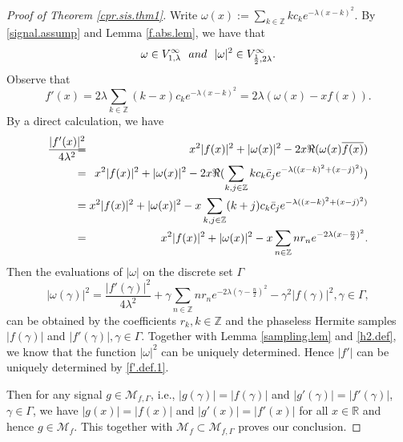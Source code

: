 \documentclass[11pt,oneside,reqno]{amsart}
\numberwithin{equation}{section}
\def\R{ {\mathbb R} }
\def\Z{ {\mathbb Z} }
\begin{document}
\begin{proof}[Proof of Theorem \ref{cpr.sis.thm1}]
 Write $\omega(x):=\sum_{k\in\Z}kc_ke^{-\lambda(x-k)^2}$.  By \eqref{signal.assump} and  Lemma \ref{f.abs.lem}, we have that
 \begin{equation}\label{h2.def}
\omega \in V^{\infty}_{1,\lambda} \ \ {\rm and} \ \
|\omega|^2\in V^{\infty}_{\frac{1}{2}, 2\lambda}.
\end{equation}
Observe that
\begin{equation*}\label{f'.def}
f'(x)=2\lambda\sum_{k\in\Z}(k-x)c_ke^{-\lambda(x-k)^2}=2\lambda(\omega(x)-xf(x)).%
\end{equation*}
By a direct calculation, we have %
\begin{eqnarray}\label{f'.def.1}
\frac{|f'(x)|^2}{4\lambda^2}\hskip-0.05in&\hskip-0.1in=&\hskip-0.1in x^2|f(x)|^2+|\omega(x)|^2 -2x\Re( \omega(x)\overline{f(x)})\nonumber\\
\hskip-0.05in&\hskip-0.1in=&\hskip-0.1in x^2|f(x)|^2+|\omega(x)|^2 -2x\Re( \sum_{k,j\in\Z}kc_k\bar{c}_je^{-\lambda((x-k)^2+(x-j)^2)})\nonumber\\
\hskip-0.05in&\hskip-0.1in=&\hskip-0.1in x^2|f(x)|^2+|\omega(x)|^2 -x\sum_{k,j\in\Z}(k+j)c_k\bar{c}_je^{-\lambda((x-k)^2+(x-j)^2)}\nonumber\\
\hskip-0.05in&\hskip-0.1in=&\hskip-0.1in x^2|f(x)|^2+|\omega(x)|^2 -x\sum_{n\in\Z}nr_ne^{-2\lambda(x-\frac{n}{2})^2}.
\end{eqnarray}
Then the evaluations of $|\omega|$ on the discrete set $\Gamma$ %
\begin{equation*}\label{h.sample}
|\omega(\gamma)|^2=\frac{|f'(\gamma)|^2}{4\lambda^2}+\gamma\sum_{n\in\Z}nr_ne^{-2\lambda(\gamma-\frac{n}{2})^2}-\gamma^2|f(\gamma)|^2, \gamma\in \Gamma,
\end{equation*}
can be obtained by the coefficients $r_k, k\in \Z$ and the phaseless Hermite samples $|f(\gamma)|$ and $|f'(\gamma)|, \gamma\in\Gamma$.
Together with Lemma \ref{sampling.lem} and \eqref{h2.def}, we know that the  function $|\omega|^2$ can be uniquely determined. %
Hence $|f'|$ can be uniquely determined by \eqref{f'.def.1}.%




Then for any signal $g\in {\mathcal M}_{f,\Gamma}$, i.e., $|g(\gamma)|=|f(\gamma)|$ and  $|g'(\gamma)|=|f'(\gamma)|$, $\gamma\in \Gamma$,  we have $|g(x)|=|f(x)|$ and $|g'(x)|=|f'(x)|$ for all $x\in \R$ and hence $g\in {\mathcal M}_f$. This together with ${\mathcal M}_{f}\subset {\mathcal M}_{f, \Gamma}$ proves our conclusion. 
\end{proof}
\end{document}
